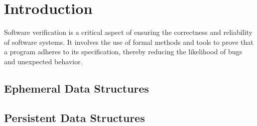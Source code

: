 \section{Introduction}
Software verification is a critical aspect of ensuring 
the correctness and reliability of software systems. 
It involves the use of formal methods and tools to 
prove that a program adheres to its specification, 
thereby reducing the likelihood of bugs and unexpected
 behavior. 
\subsection{Ephemeral Data Structures}
\subsection{Persistent Data Structures}